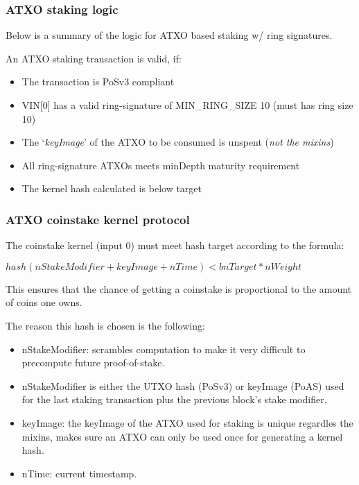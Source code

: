\subsubsection{ATXO staking logic}
Below is a summary of the logic for ATXO based staking w/ ring signatures.



An ATXO staking transaction is valid, if:
\begin{itemize}
	\item The transaction is PoSv3 compliant
	\item VIN[0] has a valid ring-signature of MIN\_RING\_SIZE 10 (must has ring size 10)
	\item The ‘\textit{keyImage}’ of the ATXO to be consumed is unspent (\textit{not the mixins})
	\item All ring-signature ATXOs meets minDepth maturity requirement
	\item The kernel hash calculated is below target
\end{itemize}



\subsubsection{ATXO coinstake kernel protocol}
The coinstake kernel (input 0) must meet hash target according to the formula:



\vspace{5mm} %
$ hash(nStakeModifier + keyImage + nTime) < bnTarget * nWeight  $
\vspace{5mm} %



This ensures that the chance of getting a coinstake is proportional to
the amount of coins one owns.



The reason this hash is chosen is the following:
\begin{itemize}
	\item nStakeModifier: scrambles computation to make it very difficult
	to precompute future proof-of-stake.
	\item nStakeModifier is either the UTXO hash (PoSv3) or keyImage (PoAS) 
	used for the last staking transaction plus the previous block's stake 
	modifier.
	\item keyImage: the keyImage of the ATXO used for staking is unique 
	regardles the mixins, makes sure an ATXO can only be used once for 
	generating a kernel hash.
	\item nTime: current timestamp.
\end{itemize}



